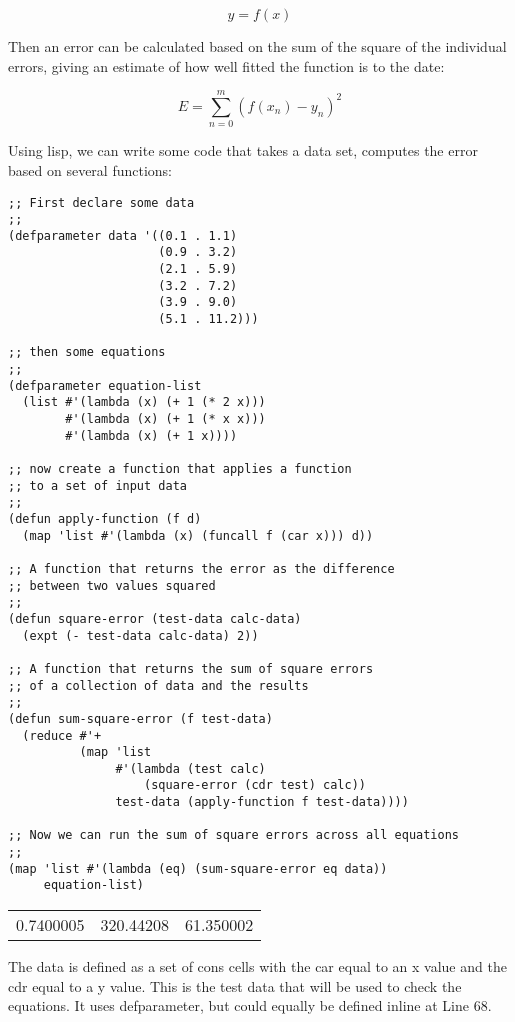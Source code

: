 \documentclass[11pt]{article}
\begin{document}
$$y = f(x)$$

Then an error can be calculated based on the sum of the square of
the individual errors, giving an estimate of how well fitted the
function is to the date:

$$E = \sum_{n=0}^m(f(x_n) - y_n)^2$$

Using lisp, we can write some code that takes a data set, computes
the error based on several functions:

\begin{verbatim}
;; First declare some data
;;
(defparameter data '((0.1 . 1.1)
                     (0.9 . 3.2)
                     (2.1 . 5.9)
                     (3.2 . 7.2)
                     (3.9 . 9.0)
                     (5.1 . 11.2)))

;; then some equations
;;
(defparameter equation-list
  (list #'(lambda (x) (+ 1 (* 2 x)))
        #'(lambda (x) (+ 1 (* x x)))
        #'(lambda (x) (+ 1 x))))

;; now create a function that applies a function
;; to a set of input data
;;
(defun apply-function (f d)
  (map 'list #'(lambda (x) (funcall f (car x))) d))

;; A function that returns the error as the difference
;; between two values squared
;;
(defun square-error (test-data calc-data)
  (expt (- test-data calc-data) 2))

;; A function that returns the sum of square errors
;; of a collection of data and the results
;;
(defun sum-square-error (f test-data)
  (reduce #'+
          (map 'list
               #'(lambda (test calc)
                   (square-error (cdr test) calc))
               test-data (apply-function f test-data))))

;; Now we can run the sum of square errors across all equations
;;
(map 'list #'(lambda (eq) (sum-square-error eq data))
     equation-list)
\end{verbatim}
\begin{center}
\begin{tabular}{rrr}
0.7400005 & 320.44208 & 61.350002\\
\end{tabular}
\end{center}

The data is defined as a set of cons cells with the car equal to an x
value and the cdr equal to a y value. This is the test data that will
be used to check the equations. It uses defparameter, but could
equally be defined inline at Line 68.
\end{document}
